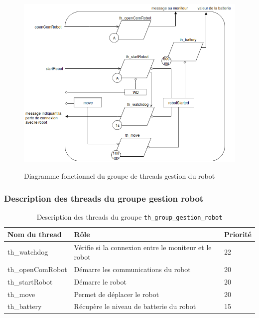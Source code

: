 \documentclass[11pt, a4paper]{paper}
\begin{document}
\begin{figure}[htp]
\label{fig:act_communiquer}
\begin{center}
{\includegraphics[scale=.4]{./dossier_conception/diag_fonc_robot.png}}
{\caption{Diagramme fonctionnel du groupe de threads gestion du robot}}
\end{center}
\end{figure}

\subsubsection{Description des threads du groupe gestion robot}

\begin{table}[htp]
\caption{Description des threads du groupe {\tt th\_group\_gestion\_robot}}
\begin{center}
\begin{tabular}{|p{3cm}|p{8.5cm}|p{2cm}|}
\hline
\bf Nom du thread &	\bf Rôle &	\bf Priorité \\
\hline
\hline
\color{blue}th\_watchdog	& \color{blue}Vérifie si la connexion entre le moniteur et le robot & \color{blue}22\\
\hline
\color{blue}th\_openComRobot	& \color{blue}Démarre les communications du robot & \color{blue}20\\
\hline
\color{blue}th\_startRobot	& \color{blue}Démarre le robot & \color{blue}20\\
\hline
\color{blue}th\_move	& \color{blue}Permet de déplacer le robot & \color{blue}20\\
\hline
\color{blue}th\_battery	& \color{blue}Récupère le niveau de batterie du robot & \color{blue}15\\
\hline
\end{tabular}
\end{center}
\label{tab:gt_moniteur}
\end{table}%
\FloatBarrier
\end{document}
